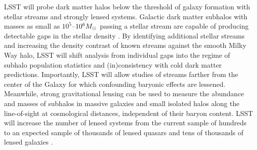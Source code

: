 \documentclass[12pt]{article}
\begin{document}
LSST will probe dark matter halos below the threshold of galaxy formation with stellar streams and strongly lensed systems.
Galactic dark matter subhalos with masses as small as $10^5$--$10^6 M_\odot$ passing a stellar stream are capable of producing detectable gaps in the stellar density \citep[][]{erkal2016,bovy:2017}.
By identifying additional stellar streams and increasing the density contrast of known streams against the smooth Milky Way halo, LSST will shift analysis from individual gaps into the regime of subhalo population statistics and (in)consistency with cold dark matter predictions.
Importantly, LSST will allow studies of streams farther from the center of the Galaxy for which confounding baryonic effects are lessened.
Meanwhile, strong gravitational lensing can be used to measure the abundance and masses of subhalos in massive galaxies and small isolated halos along the line-of-sight at cosmological distances, independent of their baryon content.
LSST will increase the number of lensed systems from the current sample of hundreds to an expected sample of thousands of lensed quasars \citep{O+M10} and tens of thousands of lensed galaxies \citep{Collett2015}.
\end{document}
